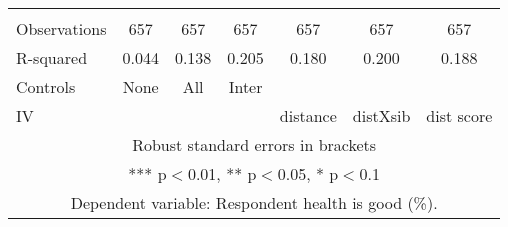 \begin{tabular}{lcccccc}
 &  &  &  &  &  &  \\
Observations & 657 & 657 & 657 & 657 & 657 & 657 \\
R-squared & 0.044 & 0.138 & 0.205 & 0.180 & 0.200 & 0.188 \\
Controls & None & All & Inter &  &  &  \\
 IV &  &  &  & distance & distXsib & dist score \\ \hline
\multicolumn{7}{c}{ Robust standard errors in brackets} \\
\multicolumn{7}{c}{ *** p$<$0.01, ** p$<$0.05, * p$<$0.1} \\
\multicolumn{7}{c}{ Dependent variable: Respondent health is good (\%).} \\
\end{tabular}
